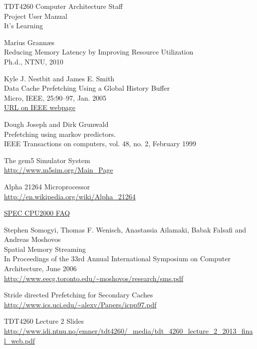 \documentclass[journal]{IEEEtran/IEEEtran}
\begin{document}
\begin{thebibliography}{9}

TDT4260 Computer Architecture Staff\\
Project User Manual\\
It's Learning

Marius Grannæs\\
Reducing Memory Latency by Improving Resource Utilization\\
Ph.d., NTNU, 2010

  Kyle J. Nestbit and James E. Smith\\
  Data Cache Prefetching Using a Global History Buffer\\
  Micro, IEEE, 25:90–97, Jan. 2005\\
  \href{http://ieeexplore.ieee.org/stamp/stamp.jsp?tp=&arnumber=1410068&isnumber=30563}{URL
    on IEEE webpage}

Dough Joseph and Dirk Grunwald\\
Prefetching using markov predictors.\\
IEEE Transactions on computers, vol. 48, no. 2, February 1999

The gem5 Simulator System\\
\url{http://www.m5sim.org/Main_Page}

Alpha 21264 Microprocessor\\
\url{http://en.wikipedia.org/wiki/Alpha_21264}

\href{http://www.spec.org/cpu2000/press/faq.html}{SPEC CPU2000 FAQ}

Stephen Somogyi, Thomas F. Wenisch,
Anastassia Ailamaki, Babak Falsafi and Andreas Moshovos\\
Spatial Memory Streaming \\
In Proceedings of the 33rd Annual International Symposium on Computer Architecture, June 2006\\
\url{http://www.eecg.toronto.edu/~moshovos/research/sms.pdf} 

Stride directed Prefetching for Secondary Caches
\url{http://www.ics.uci.edu/~alexv/Papers/icpp97.pdf}

TDT4260 Lecture 2 Slides
\url{http://www.idi.ntnu.no/emner/tdt4260/_media/tdt_4260_lecture_2_2013_final_web.pdf}

\end{thebibliography}
\end{document}
